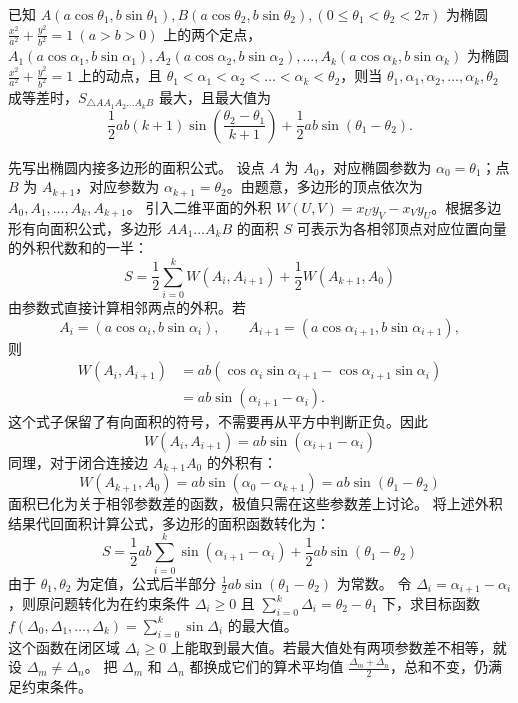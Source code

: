 \begin{example}
已知 \(A(a\cos\theta_1,b\sin\theta_1), B(a\cos\theta_2,b\sin\theta_2), (0\le\theta_1<\theta_2<2\pi)\) 为椭圆 \(\frac{x^2}{a^2}+\frac{y^2}{b^2}=1\ (a>b>0)\) 上的两个定点，\(A_1(a\cos\alpha_1,b\sin\alpha_1), A_2(a\cos\alpha_2,b\sin\alpha_2),\dots,A_k(a\cos\alpha_k,b\sin\alpha_k)\) 为椭圆 \(\frac{x^2}{a^2}+\frac{y^2}{b^2}=1\) 上的动点，且 \(\theta_1<\alpha_1<\alpha_2<\dots<\alpha_k<\theta_2\)，则当 \(\theta_1,\alpha_1,\alpha_2,\dots,\alpha_k,\theta_2\) 成等差时，\(S_{\triangle AA_1A_2\dots A_kB}\) 最大，且最大值为
\[
\frac12 ab(k+1)\sin\left(\frac{\theta_2-\theta_1}{k+1}\right)+\frac12 ab\sin(\theta_1-\theta_2).
\]
\end{example}
\begin{solution}
先写出椭圆内接多边形的面积公式。
设点 $A$ 为 $A_0$，对应椭圆参数为 $\alpha_0 = \theta_1$；点 $B$ 为 $A_{k+1}$，对应参数为 $\alpha_{k+1} = \theta_2$。由题意，多边形的顶点依次为 $A_0, A_1, \dots, A_k, A_{k+1}$。
引入二维平面的外积 $W(U, V) = x_U y_V - x_V y_U$。根据多边形有向面积公式，多边形 $AA_1\dots A_kB$ 的面积 $S$ 可表示为各相邻顶点对应位置向量的外积代数和的一半：
\[ S = \frac{1}{2} \sum_{i=0}^k W(A_i, A_{i+1}) + \frac{1}{2} W(A_{k+1}, A_0) \]
由参数式直接计算相邻两点的外积。若
\[
A_i=(a\cos\alpha_i,b\sin\alpha_i),\qquad
A_{i+1}=(a\cos\alpha_{i+1},b\sin\alpha_{i+1}),
\]
则
\[
\begin{aligned}
W(A_i,A_{i+1})
&=ab(\cos\alpha_i\sin\alpha_{i+1}-\cos\alpha_{i+1}\sin\alpha_i)\\
&=ab\sin(\alpha_{i+1}-\alpha_i).
\end{aligned}
\]
这个式子保留了有向面积的符号，不需要再从平方中判断正负。因此
\[ W(A_i, A_{i+1}) = ab \sin(\alpha_{i+1} - \alpha_i) \]
同理，对于闭合连接边 $A_{k+1}A_0$ 的外积有：
\[ W(A_{k+1}, A_0) = ab \sin(\alpha_0 - \alpha_{k+1}) = ab \sin(\theta_1 - \theta_2) \]
面积已化为关于相邻参数差的函数，极值只需在这些参数差上讨论。
将上述外积结果代回面积计算公式，多边形的面积函数转化为：
\[ S = \frac{1}{2}ab \sum_{i=0}^k \sin(\alpha_{i+1} - \alpha_i) + \frac{1}{2}ab \sin(\theta_1 - \theta_2) \]
由于 $\theta_1, \theta_2$ 为定值，公式后半部分 $\frac{1}{2}ab \sin(\theta_1 - \theta_2)$ 为常数。
令 $\Delta_i = \alpha_{i+1} - \alpha_i$，则原问题转化为在约束条件 $\Delta_i \ge 0$ 且 $\sum_{i=0}^k \Delta_i = \theta_2 - \theta_1$ 下，求目标函数 $f(\Delta_0, \Delta_1, \dots, \Delta_k) = \sum_{i=0}^k \sin\Delta_i$ 的最大值。\\
这个函数在闭区域 $\Delta_i \ge 0$ 上能取到最大值。若最大值处有两项参数差不相等，就设 $\Delta_m \neq \Delta_n$。
把 $\Delta_m$ 和 $\Delta_n$ 都换成它们的算术平均值 $\frac{\Delta_m + \Delta_n}{2}$，总和不变，仍满足约束条件。

\end{solution}
